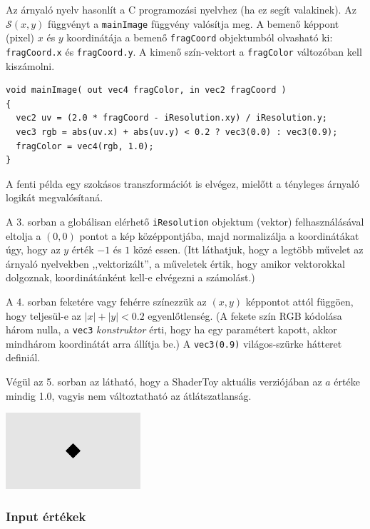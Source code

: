 Az árnyaló nyelv hasonlít a C programozási nyelvhez (ha ez segít valakinek). Az $\mathcal{S}(x,y)$
függvényt a \texttt{mainImage} függvény valósítja meg. A bemenő képpont (pixel) $x$ és $y$ koordinátája
a bemenő \texttt{fragCoord} objektumból olvasható ki: \texttt{fragCoord.x} és \texttt{fragCoord.y}.
A kimenő szín-vektort a \texttt{fragColor} változóban kell kiszámolni.

\begin{tcolorbox}[colback=yellow!5,colframe=yellow!50!black,title=Példa: ferde négyzetet rajzoló árnyaló]
\begin{verbatim}
void mainImage( out vec4 fragColor, in vec2 fragCoord )
{
  vec2 uv = (2.0 * fragCoord - iResolution.xy) / iResolution.y;
  vec3 rgb = abs(uv.x) + abs(uv.y) < 0.2 ? vec3(0.0) : vec3(0.9);
  fragColor = vec4(rgb, 1.0);
}
\end{verbatim}  
\end{tcolorbox}

A fenti példa egy szokásos transzformációt is elvégez, mielőtt a tényleges árnyaló logikát megvalósítaná.

A 3. sorban a globálisan elérhető \texttt{iResolution} objektum (vektor) felhasználásával eltolja a $(0, 0)$ pontot
a kép középpontjába, majd normalizálja a koordinátákat úgy, hogy az $y$ érték $-1$ és $1$ közé essen.
(Itt láthatjuk, hogy a legtöbb művelet az árnyaló nyelvekben ,,vektorizált'', a műveletek értik, hogy amikor
vektorokkal dolgoznak, koordinátánként kell-e elvégezni a számolást.)

A 4. sorban feketére vagy fehérre színezzük az $(x, y)$ képpontot attól függöen, hogy teljesül-e
az $|x|+|y| < 0.2$ egyenlőtlenség.
(A fekete szín RGB kódolása három nulla, a \texttt{vec3} \emph{konstruktor}
érti, hogy ha egy paramétert kapott, akkor mindhárom koordinátát arra állítja be.)
A \texttt{vec3(0.9)} világos-szürke hátteret definiál.

Végül az 5. sorban az látható, hogy a ShaderToy aktuális verziójában az $a$ értéke mindig 1.0, vagyis
nem változtatható az átlátszatlanság.

\includegraphics[width=5cm]{images/hello.png}


\subsubsection{Input értékek}

